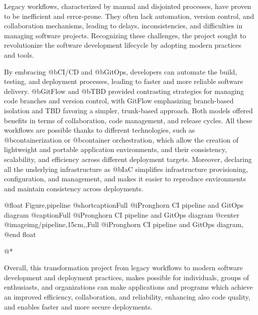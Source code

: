 Legacy workflows, characterized by manual and disjointed processes, have proven to be inefficient and error-prone. They often lack automation, version control, and collaboration mechanisms, leading to delays, inconsistencies, and difficulties in managing software projects. Recognizing these challenges, the project sought to revolutionize the software development lifecycle by adopting modern practices and tools.

By embracing @b{CI/CD} and @b{GitOps}, developers can automate the build, testing, and deployment processes, leading to faster and more reliable software delivery. @b{GitFlow} and @b{TBD} provided contrasting strategies for managing code branches and version control, with GitFlow emphasizing branch-based isolation and TBD favoring a simpler, trunk-based approach. Both models offered benefits in terms of collaboration, code management, and release cycles. All these workflows are possible thanks to different technologies, such as @b{containerization} or @b{container orchestration}, which allow the creation of lightweight and portable application environments, and their consistency, scalability, and efficiency across different deployment targets. Moreover, declaring all the underlying infrastructure as @b{IaC} simplifies infrastructure provisioning, configuration, and management, and makes it easier to reproduce environments and maintain consistency across deployments.

@float Figure,pipeline
@shortcaption{Full @i{Pronghorn} CI pipeline and GitOps diagram}
@caption{Full @i{Pronghorn} CI pipeline and GitOps diagram}
@center @image{img/pipeline,15cm,,Full @i{Pronghorn} CI pipeline and GitOps diagram,}
@end float

@*

Overall, this transformation project from legacy workflows to modern software development and deployment practices, makes possible for individuals, groups of enthusiasts, and organizations can make applications and programs which achieve an improved efficiency, collaboration, and reliability, enhancing also code quality, and enables faster and more secure deployments.
